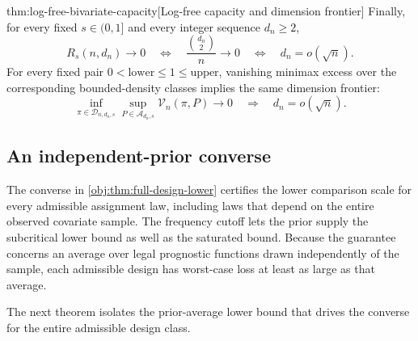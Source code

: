 \documentclass[11pt]{article}
\begin{document}
\begin{theoremv}{thm:log-free-bivariate-capacity}[Log-free capacity and dimension frontier]
Finally, for every fixed \(s\in(0,1]\) and every integer sequence \(d_n\geq2\),
\[
R_s(n,d_n)\longrightarrow0
\quad\Longleftrightarrow\quad
\frac{\binom{d_n}{2}}n\longrightarrow0
\quad\Longleftrightarrow\quad
d_n=o(\sqrt n).
\]
For every fixed pair \(0<\mathrm{lower}\leq1\leq\mathrm{upper}\), vanishing minimax excess over the corresponding bounded-density classes implies the same dimension frontier:
\[
\inf_{\pi\in\mathcal D_{n,d_n,s}}
 \sup_{P\in\mathcal A_{d_n,s}}\mathcal V_n(\pi,P)
\longrightarrow0
\quad\Longrightarrow\quad
d_n=o(\sqrt n).
\]
\end{theoremv}

\subsection{An independent-prior converse}

The converse in \cref{obj:thm:full-design-lower} certifies the lower comparison scale  for every admissible assignment law, including laws that depend on the entire observed covariate sample. The frequency cutoff lets the prior supply the subcritical lower bound as well as the saturated bound. Because the guarantee concerns an average over legal prognostic functions drawn independently of the sample, each admissible design has worst-case loss at least as large as that average.

The next theorem isolates the prior-average lower bound that drives the converse for the entire admissible design class.
\end{document}
